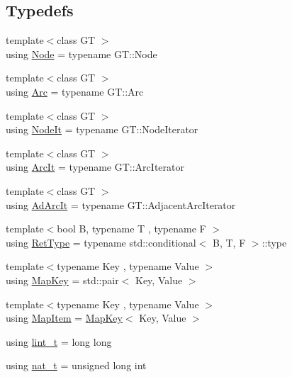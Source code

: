 \subsection*{Typedefs}
\begin{DoxyCompactItemize}
\item 
{\footnotesize template$<$class GT $>$ }\\using \hyperlink{namespace_designar_a5af326c65aa2bd26b26c410f2030d09e}{Node} = typename G\+T\+::\+Node
\item 
{\footnotesize template$<$class GT $>$ }\\using \hyperlink{namespace_designar_a3f55fb5513d62ff47cbc8f72b8e95d6f}{Arc} = typename G\+T\+::\+Arc
\item 
{\footnotesize template$<$class GT $>$ }\\using \hyperlink{namespace_designar_a5fdef28ed7c6b948482379ebabf927ce}{Node\+It} = typename G\+T\+::\+Node\+Iterator
\item 
{\footnotesize template$<$class GT $>$ }\\using \hyperlink{namespace_designar_a30ebaaade3ffa312c33d6e1234a96952}{Arc\+It} = typename G\+T\+::\+Arc\+Iterator
\item 
{\footnotesize template$<$class GT $>$ }\\using \hyperlink{namespace_designar_a88b020661576bc09a536766283ec1790}{Ad\+Arc\+It} = typename G\+T\+::\+Adjacent\+Arc\+Iterator
\item 
{\footnotesize template$<$bool B, typename T , typename F $>$ }\\using \hyperlink{namespace_designar_ab937f9c4bf5f1d0e65dbc616245d50ee}{Ret\+Type} = typename std\+::conditional$<$ B, T, F $>$\+::type
\item 
{\footnotesize template$<$typename Key , typename Value $>$ }\\using \hyperlink{namespace_designar_a7394b1b25278abf7211e77b91eb5204f}{Map\+Key} = std\+::pair$<$ Key, Value $>$
\item 
{\footnotesize template$<$typename Key , typename Value $>$ }\\using \hyperlink{namespace_designar_abc6ea5602461a15100a645d1f0e5cbcb}{Map\+Item} = \hyperlink{namespace_designar_a7394b1b25278abf7211e77b91eb5204f}{Map\+Key}$<$ Key, Value $>$
\item 
using \hyperlink{namespace_designar_a9d113d66a39e82b73727c72cd3a52f73}{lint\+\_\+t} = long long
\item 
using \hyperlink{namespace_designar_aa72662848b9f4815e7bf31a7cf3e33d1}{nat\+\_\+t} = unsigned long int

\end{DoxyCompactItemize}
